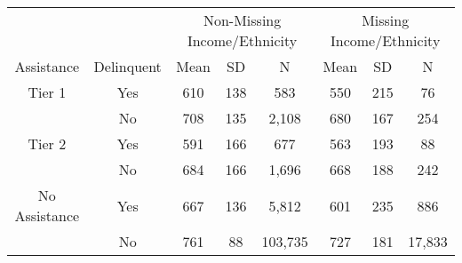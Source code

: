 \begin{tabular}{cccccccc}
\toprule 
\midrule 
\multicolumn{2}{c}{} & \multicolumn{3}{c}{Non-Missing Income/Ethnicity} & \multicolumn{3}{c}{Missing Income/Ethnicity} \\
 \cmidrule(lr){3-5} \cmidrule(lr){6-8} 
Assistance & Delinquent & Mean & SD & N & Mean & SD & N \\
\midrule 
Tier 1 & Yes & 610 & 138 & 583 & 550 & 215 & 76 \\
 & No & 708 & 135 & 2,108 & 680 & 167 & 254 \\
\midrule 
Tier 2 & Yes & 591 & 166 & 677 & 563 & 193 & 88 \\
 & No & 684 & 166 & 1,696 & 668 & 188 & 242 \\
\midrule 
No Assistance & Yes & 667 & 136 & 5,812 & 601 & 235 & 886 \\
 & No & 761 & 88 & 103,735 & 727 & 181 & 17,833 \\
\midrule 
\bottomrule 
\end{tabular}
